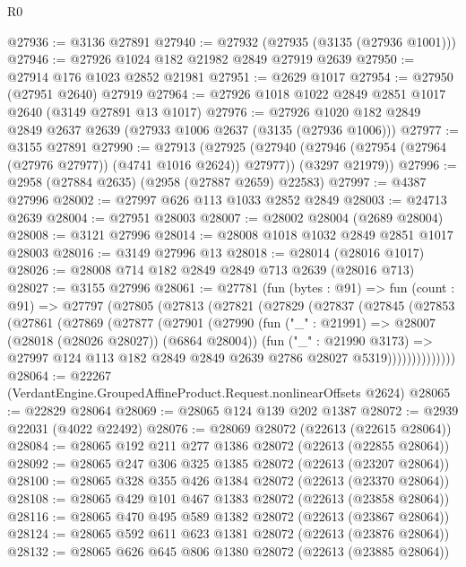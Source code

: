 \begin{lexlean}{R0}
\begin{coremodule}
@27936 := @3136 @27891
@27940 := @27932 (@27935 (@3135 (@27936 @1001)))
@27946 := @27926 @1024 @182 @21982 @2849 @27919 @2639
@27950 := @27914 @176 @1023 @2852 @21981
@27951 := @2629 @1017
@27954 := @27950 (@27951 @2640) @27919
@27964 := @27926 @1018 @1022 @2849 @2851 @1017 @2640 (@3149 @27891 @13 @1017)
@27976 := @27926 @1020 @182 @2849 @2849 @2637 @2639 (@27933 @1006 @2637 (@3135 (@27936 @1006)))
@27977 := @3155 @27891
@27990 := @27913
    (@27925
      (@27940 (@27946 (@27954 (@27964 (@27976 @27977)) (@4741 @1016 @2624)) @27977))
      (@3297 @21979))
@27996 := @2958 (@27884 @2635) (@2958 (@27887 @2659) @22583)
@27997 := @4387 @27996
@28002 := @27997 @626 @113 @1033 @2852 @2849
@28003 := @24713 @2639
@28004 := @27951 @28003
@28007 := @28002 @28004 (@2689 @28004)
@28008 := @3121 @27996
@28014 := @28008 @1018 @1032 @2849 @2851 @1017 @28003
@28016 := @3149 @27996 @13
@28018 := @28014 (@28016 @1017)
@28026 := @28008 @714 @182 @2849 @2849 @713 @2639 (@28016 @713)
@28027 := @3155 @27996
@28061 := @27781
    (fun (bytes : @91) =>
    fun (count : @91) =>
    @27797
      (@27805
        (@27813
          (@27821
            (@27829
              (@27837
                (@27845
                  (@27853
                    (@27861
                      (@27869
                        (@27877
                          (@27901
                            (@27990
                              (fun ("_" : @21991) => @28007 (@28018 (@28026 @28027)) (@6864 @28004))
                              (fun ("_" : @21990 @3173) =>
                              @27997
                                @124
                                @113
                                @182
                                @2849
                                @2849
                                @2639
                                @2786
                                @28027
                                @5319))))))))))))))
@28064 := @22267 (VerdantEngine.GroupedAffineProduct.Request.nonlinearOffsets @2624)
@28065 := @22829 @28064
@28069 := @28065 @124 @139 @202 @1387
@28072 := @2939 @22031 (@4022 @22492)
@28076 := @28069 @28072 (@22613 (@22615 @28064))
@28084 := @28065 @192 @211 @277 @1386 @28072 (@22613 (@22855 @28064))
@28092 := @28065 @247 @306 @325 @1385 @28072 (@22613 (@23207 @28064))
@28100 := @28065 @328 @355 @426 @1384 @28072 (@22613 (@23370 @28064))
@28108 := @28065 @429 @101 @467 @1383 @28072 (@22613 (@23858 @28064))
@28116 := @28065 @470 @495 @589 @1382 @28072 (@22613 (@23867 @28064))
@28124 := @28065 @592 @611 @623 @1381 @28072 (@22613 (@23876 @28064))
@28132 := @28065 @626 @645 @806 @1380 @28072 (@22613 (@23885 @28064))

\end{coremodule}
\end{lexlean}
